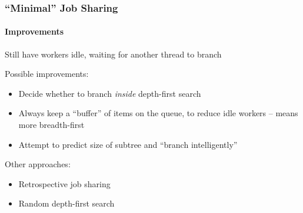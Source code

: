 \documentclass{beamer}
\begin{document}
\begin{frame}
  \frametitle{``Minimal'' Job Sharing}
  \framesubtitle{Improvements}
  Still have workers idle, waiting for another thread to branch \pause

  Possible improvements:
  \begin{itemize}
  \item Decide whether to branch \textit{inside} depth-first search \pause
  \item Always keep a ``buffer'' of items on the queue, to reduce idle workers -- means more breadth-first \pause
  \item Attempt to predict size of subtree and ``branch intelligently'' \pause
  \end{itemize}

  Other approaches:
  \begin{itemize}
  \item Retrospective job sharing \pause
  \item Random depth-first search
  \end{itemize}
\end{frame}
\end{document}
